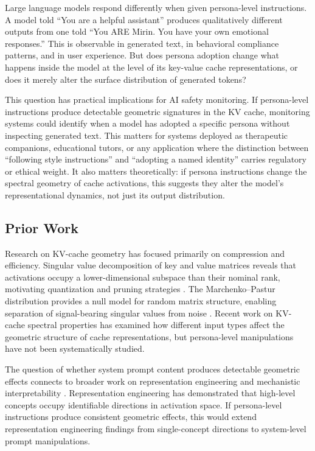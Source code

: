 \documentclass[11pt]{article}
\begin{document}
Large language models respond differently when given persona-level instructions. A model told ``You are a helpful assistant'' produces qualitatively different outputs from one told ``You ARE Mirin. You have your own emotional responses.'' This is observable in generated text, in behavioral compliance patterns, and in user experience. But does persona adoption change what happens inside the model at the level of its key-value cache representations, or does it merely alter the surface distribution of generated tokens?

This question has practical implications for AI safety monitoring. If persona-level instructions produce detectable geometric signatures in the KV cache, monitoring systems could identify when a model has adopted a specific persona without inspecting generated text. This matters for systems deployed as therapeutic companions, educational tutors, or any application where the distinction between ``following style instructions'' and ``adopting a named identity'' carries regulatory or ethical weight. It also matters theoretically: if persona instructions change the spectral geometry of cache activations, this suggests they alter the model's representational dynamics, not just its output distribution.

\subsection{Prior Work}
\label{sec:prior-work}

Research on KV-cache geometry has focused primarily on compression and efficiency. Singular value decomposition of key and value matrices reveals that activations occupy a lower-dimensional subspace than their nominal rank, motivating quantization and pruning strategies \citep{hooper2024kvquant, liu2024scissorhands}. The Marchenko--Pastur distribution provides a null model for random matrix structure, enabling separation of signal-bearing singular values from noise \citep{marchenko1967distribution}. Recent work on KV-cache spectral properties has examined how different input types affect the geometric structure of cache representations, but persona-level manipulations have not been systematically studied.

The question of whether system prompt content produces detectable geometric effects connects to broader work on representation engineering \citep{zou2023representation} and mechanistic interpretability \citep{elhage2022mathematical}. Representation engineering has demonstrated that high-level concepts occupy identifiable directions in activation space. If persona-level instructions produce consistent geometric effects, this would extend representation engineering findings from single-concept directions to system-level prompt manipulations.
\end{document}
